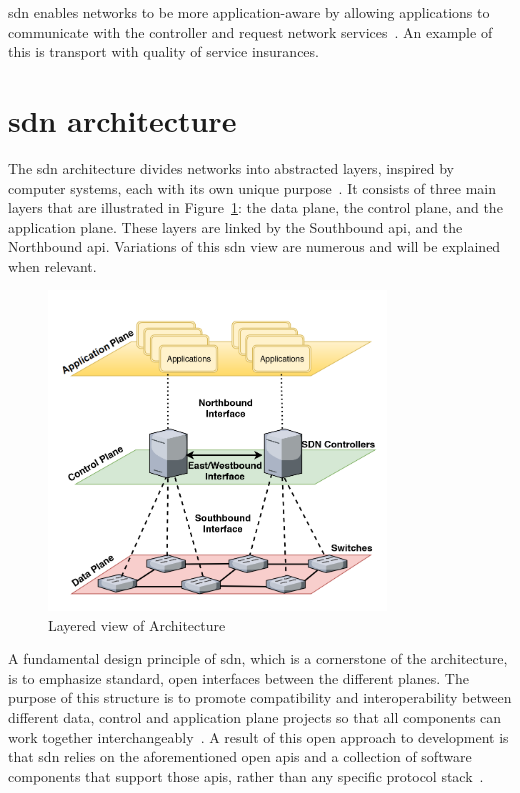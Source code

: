 \gls{sdn} enables networks to be more application-aware by allowing applications to communicate with the controller and request network services~\cite{thyagaturu_software_2016}. An example of this is transport with quality of service insurances. 


\section[SDN architecture]{\gls{sdn} architecture} %
\label{sec:sdn_arch}

The \gls{sdn} architecture divides networks into abstracted layers, inspired by computer systems, each with its own unique purpose~\cite{kreutz_software-defined_2015}. It consists of three main layers that are illustrated in Figure~\ref{fig:sdn_layers}: the data plane, the control plane, and the application plane. These layers are linked by the Southbound \gls{api}, and the Northbound \gls{api}. Variations of this \gls{sdn} view are numerous and will be explained when relevant.

\begin{figure}
	\centering
	\includegraphics[width=0.8\textwidth]{Chapters/Figures/SDNs/LAYERS.png}
	\caption{Layered view of  Architecture~\cite{latif_comprehensive_2020}}
	\label{fig:sdn_layers}
\end{figure}

A fundamental design principle of \gls{sdn}, which is a cornerstone of the architecture, is to emphasize standard, open interfaces between the different planes. The purpose of this structure is to promote compatibility and interoperability between different data, control and application plane projects so that all components can work together interchangeably~\cite{kreutz_software-defined_2015}. A result of this open approach to development is that \gls{sdn} relies on the aforementioned open \glspl{api} and a collection of software components that support those \glspl{api}, rather than any specific protocol stack~\cite{peterson_software-defined_2021}. 

